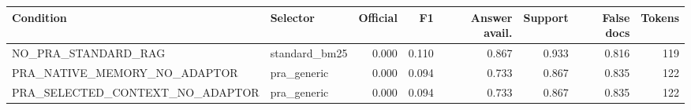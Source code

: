 \begin{tabular}{llrrrrrr}
\toprule
Condition & Selector & Official & F1 & Answer avail. & Support & False docs & Tokens \\
\midrule
NO\_PRA\_STANDARD\_RAG & standard\_bm25 & 0.000 & 0.110 & 0.867 & 0.933 & 0.816 & 119 \\
PRA\_NATIVE\_MEMORY\_NO\_ADAPTOR & pra\_generic & 0.000 & 0.094 & 0.733 & 0.867 & 0.835 & 122 \\
PRA\_SELECTED\_CONTEXT\_NO\_ADAPTOR & pra\_generic & 0.000 & 0.094 & 0.733 & 0.867 & 0.835 & 122 \\
\bottomrule
\end{tabular}
